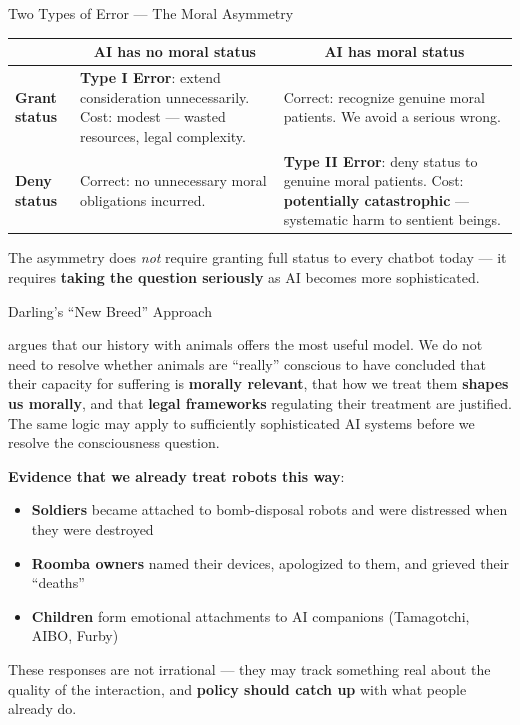 \documentclass[aspectratio=169,11pt]{beamer}
\begin{document}
\begin{frame}[shrink=5]{Two Types of Error --- The Moral Asymmetry}
\begin{center}
\small
\renewcommand{\arraystretch}{1.35}
\setlength{\tabcolsep}{6pt}
\begin{tabular}{@{}p{2.35cm}p{4.85cm}p{4.85cm}@{}}
\toprule
& \multicolumn{1}{c}{\textbf{AI has no moral status}} & \multicolumn{1}{c}{\textbf{AI has moral status}} \\
\midrule
\textbf{Grant status} & \textbf{Type I Error}: extend consideration unnecessarily. Cost: modest --- wasted resources, legal complexity. & Correct: recognize genuine moral patients. We avoid a serious wrong. \\
\textbf{Deny status} & Correct: no unnecessary moral obligations incurred. & \textbf{Type II Error}: deny status to genuine moral patients. Cost: \textbf{potentially catastrophic} --- systematic harm to sentient beings. \\
\bottomrule
\end{tabular}
\end{center}

\vspace{0.05cm}
The asymmetry does \emph{not} require granting full status to every chatbot today --- it requires \textbf{taking the question seriously} as AI becomes more sophisticated.
\end{frame}

\begin{frame}[shrink=5]{Darling's ``New Breed'' Approach}
\begin{conceptbox}
\scriptsize
\textcite{darling_new_breed} argues that our history with animals offers the most useful model. We do not need to resolve whether animals are ``really'' conscious to have concluded that their capacity for suffering is \textbf{morally relevant}, that how we treat them \textbf{shapes us morally}, and that \textbf{legal frameworks} regulating their treatment are justified. The same logic may apply to sufficiently sophisticated AI systems before we resolve the consciousness question.
\end{conceptbox}

\vspace{0.1cm}
\textbf{Evidence that we already treat robots this way}:
\begin{itemize}
    \item \textbf{Soldiers} became attached to bomb-disposal robots and were distressed when they were destroyed
    \item \textbf{Roomba owners} named their devices, apologized to them, and grieved their ``deaths''
    \item \textbf{Children} form emotional attachments to AI companions (Tamagotchi, AIBO, Furby)
\end{itemize}

\vspace{0.1cm}
These responses are not irrational --- they may track something real about the quality of the interaction, and \textbf{policy should catch up} with what people already do.
\end{frame}
\end{document}
